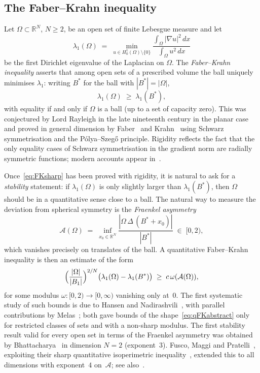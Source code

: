 \documentclass[11pt]{article}
\theoremstyle{definition}
\newcommand{\R}{\mathbb{R}}
\newcommand{\Fr}{\mathcal{A}}
\newcommand{\Om}{\Omega}
\begin{document}
\subsection{The Faber--Krahn inequality}\label{ssec:FK}

Let $\Om\subset\R^N$, $N\ge2$, be an open set of finite Lebesgue measure
and let
\[
   \lambda_1(\Om)\;=\;\min_{u\in H^1_0(\Om)\setminus\{0\}}
                    \frac{\int_\Om|\nabla u|^2\,dx}{\int_\Om u^2\,dx}
\]
be the first Dirichlet eigenvalue of the Laplacian on $\Om$. The
\emph{Faber--Krahn inequality} asserts that among open sets of a
prescribed volume the ball uniquely minimises $\lambda_1$: writing
$B^*$ for the ball with $|B^*|=|\Om|$,
\begin{equation}\label{eq:FKsharp}
   \lambda_1(\Om)\;\ge\;\lambda_1(B^*),
\end{equation}
with equality if and only if $\Om$ is a ball (up to a set of capacity
zero). This was conjectured by Lord Rayleigh in the late nineteenth
century in the planar case and proved in general dimension by
Faber~\cite{Faber1923} and Krahn~\cite{Krahn1925} using Schwarz
symmetrisation and the P\'olya--Szeg\H{o} principle. Rigidity reflects
the fact that the only equality cases of Schwarz symmetrisation in the
gradient norm are radially symmetric functions; modern accounts
appear in~\cite{KawohlBook,HenrotBook,BucurButtazzo}.

Once~\eqref{eq:FKsharp} has been proved with rigidity, it is natural
to ask for a \emph{stability} statement: if $\lambda_1(\Om)$ is only
slightly larger than $\lambda_1(B^*)$, then $\Om$ should be in a
quantitative sense close to a ball. The natural way to measure the
deviation from spherical symmetry is the \emph{Fraenkel asymmetry}
\begin{equation}\label{eq:Fraenkel}
   \Fr(\Om)\;=\;\inf_{x_0\in\R^N}
   \frac{|\Om\,\Delta\,(B^*+x_0)|}{|B^*|}\;\in\;[0,2),
\end{equation}
which vanishes precisely on translates of the ball. A quantitative
Faber--Krahn inequality is then an estimate of the form
\begin{equation}\label{eq:qFKabstract}
   \Bigl(\frac{|\Om|}{|B_1|}\Bigr)^{2/N}
   \bigl(\lambda_1(\Om)-\lambda_1(B^*)\bigr)
   \;\ge\;c\,\omega(\Fr(\Om)),
\end{equation}
for some modulus $\omega:[0,2)\to[0,\infty)$ vanishing only at~$0$.
The first systematic study of such bounds is due to Hansen and
Nadirashvili~\cite{HansenNadirashvili1994}, with parallel
contributions by Melas~\cite{Melas1992}; both gave
bounds of the shape~\eqref{eq:qFKabstract} only for restricted
classes of sets and with a non-sharp modulus. The first stability
result valid for every open set in terms of the Fraenkel asymmetry was
obtained by Bhattacharya~\cite{Bhattacharya2001} in dimension $N=2$
(exponent~$3$). Fusco, Maggi and Pratelli~\cite{FMPLaplace}, exploiting
their sharp quantitative isoperimetric inequality~\cite{FMP}, extended
this to all dimensions with exponent~$4$ on~$\Fr$; see
also~\cite{Brasco2014,BraDeP2017}.
\end{document}
